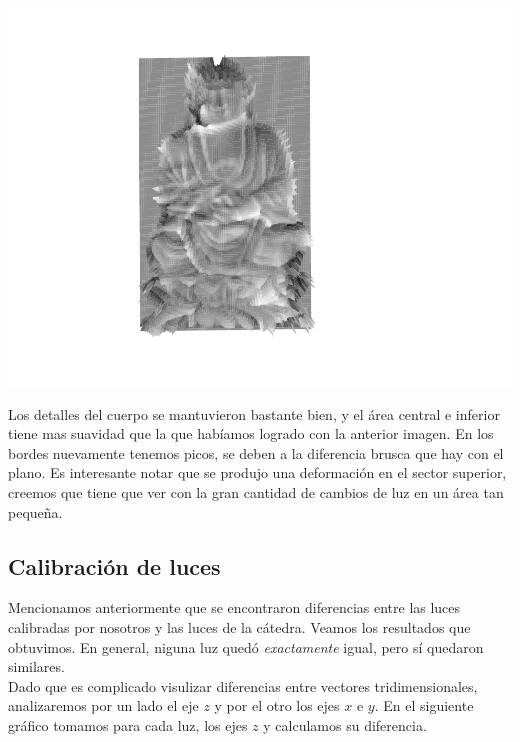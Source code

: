 {\centering
    \includegraphics[scale=0.8]{informe/imagenes/profundidades/profundidadesBudaLucesPropias012.pdf} \\
}

Los detalles del cuerpo se mantuvieron bastante bien, y el área central e inferior tiene mas suavidad que la que habíamos logrado con la anterior imagen. En los bordes nuevamente tenemos picos, se deben a la diferencia brusca que hay con el plano. Es interesante notar que se produjo una deformación en el sector superior, creemos que tiene que ver con la gran cantidad de cambios de luz en un área tan pequeña. \\


\newpage
\subsection{Calibración de luces}

Mencionamos anteriormente que se encontraron diferencias entre las luces calibradas por nosotros y las luces  de la cátedra. Veamos los resultados que obtuvimos. En general, niguna luz quedó \textit{exactamente} igual, pero sí quedaron similares. \\

Dado que es complicado visulizar diferencias entre vectores tridimensionales, analizaremos por un lado el eje $z$ y por el otro los ejes $x$ e $y$. En el siguiente gráfico tomamos para cada luz, los ejes $z$ y calculamos su diferencia. \\

